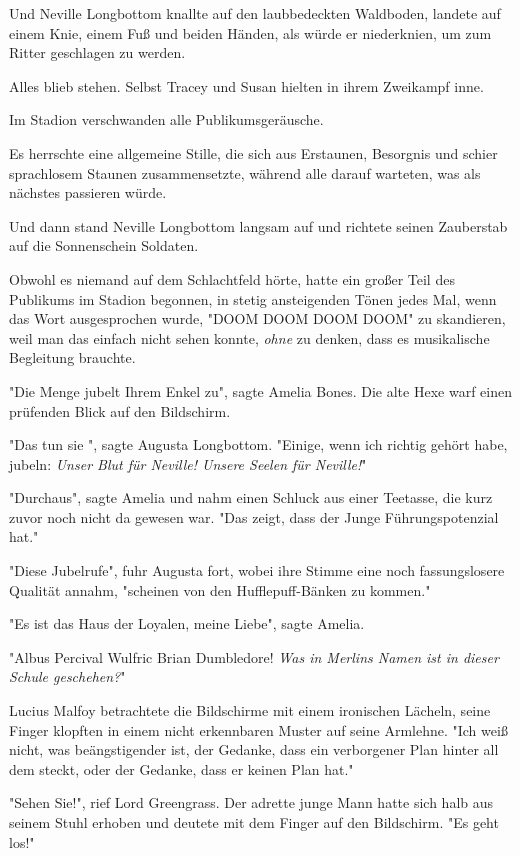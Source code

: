 {Und Neville Longbottom knallte auf den laubbedeckten Waldboden, landete auf einem Knie, einem Fuß und beiden Händen, als würde er niederknien, um zum Ritter geschlagen zu werden.

Alles blieb stehen. Selbst Tracey und Susan hielten in ihrem Zweikampf inne.

Im Stadion verschwanden alle Publikumsgeräusche.

Es herrschte eine allgemeine Stille, die sich aus Erstaunen, Besorgnis und schier sprachlosem Staunen zusammensetzte, während alle darauf warteten, was als nächstes passieren würde.

Und dann stand Neville Longbottom langsam auf und richtete seinen Zauberstab auf die Sonnenschein Soldaten.

Obwohl es niemand auf dem Schlachtfeld hörte, hatte ein großer Teil des Publikums im Stadion begonnen, in stetig ansteigenden Tönen jedes Mal, wenn das Wort ausgesprochen wurde, "DOOM DOOM DOOM DOOM" zu skandieren, weil man das einfach nicht sehen konnte, \emph{ohne} zu denken, dass es musikalische Begleitung brauchte.

"Die Menge jubelt Ihrem Enkel zu", sagte Amelia Bones. Die alte Hexe warf einen prüfenden Blick auf den Bildschirm.

"Das tun sie ", sagte Augusta Longbottom. "Einige, wenn ich richtig gehört habe, jubeln: \emph{Unser Blut für Neville! Unsere Seelen für Neville!}"

"Durchaus", sagte Amelia und nahm einen Schluck aus einer Teetasse, die kurz zuvor noch nicht da gewesen war. "Das zeigt, dass der Junge Führungspotenzial hat."

"Diese Jubelrufe", fuhr Augusta fort, wobei ihre Stimme eine noch fassungslosere Qualität annahm, "scheinen von den Hufflepuff-Bänken zu kommen."

"Es ist das Haus der Loyalen, meine Liebe", sagte Amelia.

"Albus Percival Wulfric Brian Dumbledore! \emph{Was in Merlins Namen ist in dieser Schule geschehen?}"

Lucius Malfoy betrachtete die Bildschirme mit einem ironischen Lächeln, seine Finger klopften in einem nicht erkennbaren Muster auf seine Armlehne. "Ich weiß nicht, was beängstigender ist, der Gedanke, dass ein verborgener Plan hinter all dem steckt, oder der Gedanke, dass er keinen Plan hat."

"Sehen Sie!", rief Lord Greengrass. Der adrette junge Mann hatte sich halb aus seinem Stuhl erhoben und deutete mit dem Finger auf den Bildschirm. "Es geht los!"

}
